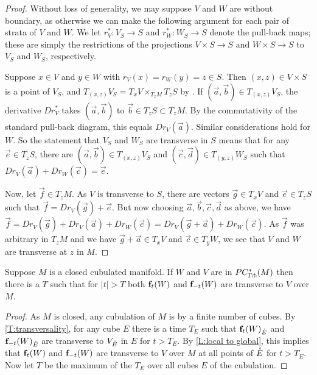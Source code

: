 \begin{proof}
	Without loss of generality, we may suppose $V$ and $W$ are without boundary, as otherwise we can make the following argument for each pair of strata of $V$ and $W$.
	We let $r_V^* \colon V_S \to S$ and $r_W^* \colon W_S \to S$ denote the pull-back maps; these are simply the restrictions of the projections $V \times S \to S$ and $W \times S \to S$ to $V_S$ and $W_S$, respectively.

	Suppose $x \in V$ and $y \in W$ with $r_V(x) = r_W(y) = z \in S$.
	Then $(x,z) \in V \times S$ is a point of $V_S$, and $T_{(x,z)}V_S = T_xV \times_{T_zM} T_zS$ by \cite[Lemma 2.28]{medina2022foundations}.
	If $(\vec a,\vec b) \in T_{(x,z)}V_S$, the derivative $Dr_V^*$ takes $(\vec a,\vec b)$ to $\vec b \in T_z S \subset T_zM$.
	By the commutativity of the standard pull-back diagram, this equals $Dr_V(\vec a)$.
	Similar considerations hold for $W$.
	So the statement that $V_S$ and $W_S$ are transverse in $S$ means that for any $\vec e \in T_z S$, there are $(\vec a,\vec b) \in T_{(x,z)}V_S$ and $(\vec c,\vec d) \in T_{(y,z)}W_S$ such that $Dr_V(\vec a) + Dr_W(\vec c) = \vec e$.

	Now, let $\vec f \in T_z M$.
	As $V$ is transverse to $S$, there are vectors $\vec g \in T_x V$ and $\vec e \in T_z S$ such that $\vec f = Dr_V(\vec g) + \vec e$.
	But now choosing $\vec a,\vec b,\vec c,\vec d$ as above, we have $\vec f = Dr_V(\vec g) + Dr_V(\vec a) + Dr_W(\vec c) = Dr_V(\vec g + \vec a) +Dr_W(\vec c)$.
	As $\vec f$ was arbitrary in $T_zM$ and we have $\vec g + \vec a \in T_x V$ and $\vec c \in T_y W$, we see that $V$ and $W$ are transverse at $z$ in $M$.
\end{proof}

\begin{corollary}
	Suppose $M$ is a closed cubulated manifold.
	If $W$ and $V$ are in $PC_{\Gamma \pitchfork}^*(M)$ then there is a $T$ such that for $|t|>T$ both $\mathbf{f}_t(W)$ and $\mathbf{f}_{-t}(W)$ are transverse to $V$ over $M$.
\end{corollary}

\begin{proof}
	As $M$ is closed, any cubulation of $M$ is by a finite number of cubes.
	By \cref{T:transversality}, for any cube $E$ there is a time $T_E$ such that $\mathbf{f}_t(W)_{\mathring{E}}$ and $\mathbf{f}_{-t}(W)_{\mathring{E}}$ are transverse to $V_{\mathring{E}}$ in $E$ for $t > T_E$.
	By \cref{L:local to global}, this implies that $\mathbf{f}_t(W)$ and $\mathbf{f}_{-t}(W)$ are transverse to $V$ over $M$ at all points of $\mathring{E}$ for $t > T_E$.
	Now let $T$ be the maximum of the $T_E$ over all cubes $E$ of the cubulation.
\end{proof}

